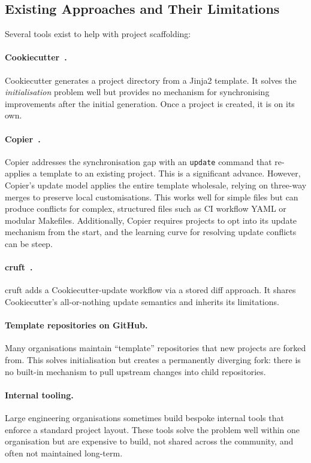 \documentclass[12pt,a4paper]{article}
\begin{document}
\subsection{Existing Approaches and Their Limitations}

Several tools exist to help with project scaffolding:

\paragraph{Cookiecutter~\cite{cookiecutter}.} Cookiecutter generates a project directory from a Jinja2 template. It solves the \emph{initialisation} problem well but provides no mechanism for synchronising improvements after the initial generation. Once a project is created, it is on its own.

\paragraph{Copier~\cite{copier}.} Copier addresses the synchronisation gap with an \texttt{update} command that re-applies a template to an existing project. This is a significant advance. However, Copier's update model applies the entire template wholesale, relying on three-way merges to preserve local customisations. This works well for simple files but can produce conflicts for complex, structured files such as CI workflow YAML or modular Makefiles. Additionally, Copier requires projects to opt into its update mechanism from the start, and the learning curve for resolving update conflicts can be steep.

\paragraph{cruft~\cite{cruft}.} cruft adds a Cookiecutter-update workflow via a stored diff approach. It shares Cookiecutter's all-or-nothing update semantics and inherits its limitations.

\paragraph{Template repositories on GitHub.} Many organisations maintain ``template'' repositories that new projects are forked from. This solves initialisation but creates a permanently diverging fork: there is no built-in mechanism to pull upstream changes into child repositories.

\paragraph{Internal tooling.} Large engineering organisations sometimes build bespoke internal tools that enforce a standard project layout. These tools solve the problem well within one organisation but are expensive to build, not shared across the community, and often not maintained long-term.
\end{document}
